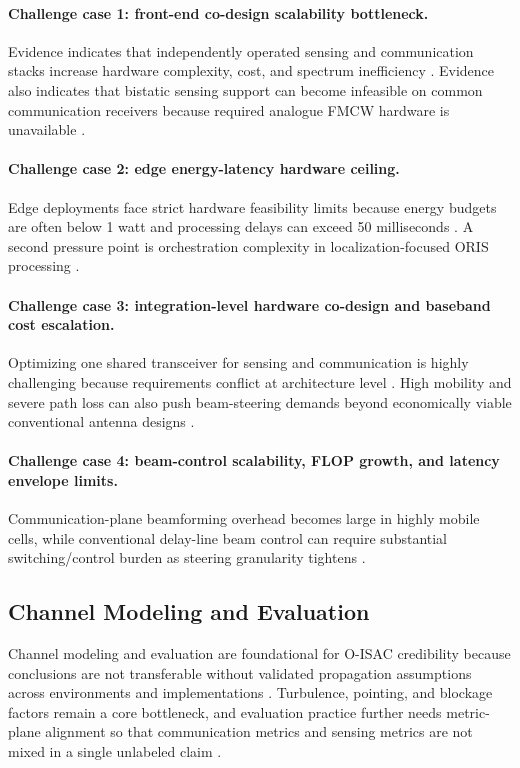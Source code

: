 \paragraph{Challenge case 1: front-end co-design scalability bottleneck.}
Evidence indicates that independently operated sensing and communication stacks increase hardware complexity, cost, and spectrum inefficiency \cite{O_ISAC_237}. Evidence also indicates that bistatic sensing support can become infeasible on common communication receivers because required analogue FMCW hardware is unavailable \cite{O_ISAC_237}.

\paragraph{Challenge case 2: edge energy-latency hardware ceiling.}
Edge deployments face strict hardware feasibility limits because energy budgets are often below 1 watt and processing delays can exceed 50 milliseconds \cite{O_ISAC_093}. A second pressure point is orchestration complexity in localization-focused ORIS processing \cite{O_ISAC_112}.

\paragraph{Challenge case 3: integration-level hardware co-design and baseband cost escalation.}
Optimizing one shared transceiver for sensing and communication is highly challenging because requirements conflict at architecture level \cite{O_ISAC_161}. High mobility and severe path loss can also push beam-steering demands beyond economically viable conventional antenna designs \cite{O_ISAC_142}.

\paragraph{Challenge case 4: beam-control scalability, FLOP growth, and latency envelope limits.}
Communication-plane beamforming overhead becomes large in highly mobile cells, while conventional delay-line beam control can require substantial switching/control burden as steering granularity tightens \cite{O_ISAC_134,O_ISAC_171}.

\subsection{Channel Modeling and Evaluation}

Channel modeling and evaluation are foundational for O-ISAC credibility because conclusions are not transferable without validated propagation assumptions across environments and implementations \cite{O_ISAC_005,O_ISAC_327}. Turbulence, pointing, and blockage factors remain a core bottleneck, and evaluation practice further needs metric-plane alignment so that communication metrics and sensing metrics are not mixed in a single unlabeled claim \cite{O_ISAC_381,O_ISAC_050}.

